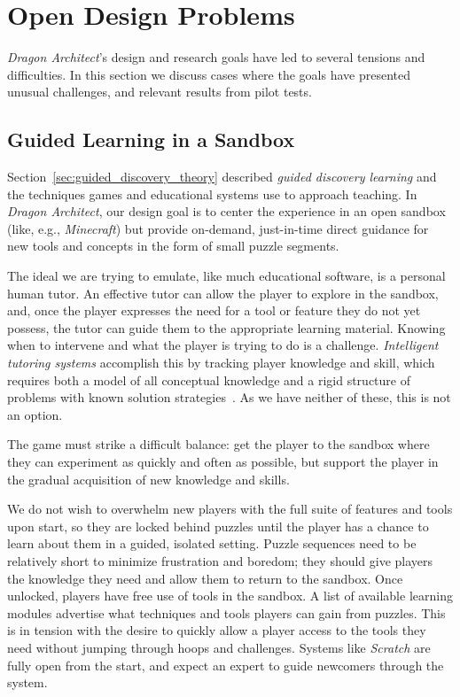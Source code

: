 \documentclass{sig-alternate}
\newcommand{\gametitle}{{\emph{Dragon Architect}}}
\begin{document}
\section{Open Design Problems}
\gametitle{}'s design and research goals have led to several tensions and difficulties.
In this section we discuss cases where the goals have presented unusual challenges, and relevant results from pilot tests.

\subsection{Guided Learning in a Sandbox}
\label{sec:direct_guidance}

Section~\ref{sec:guided_discovery_theory} described \emph{guided discovery learning} and the techniques games and educational systems use to approach teaching.
In \gametitle{}, our design goal is to center the experience in an open sandbox (like, e.g., \emph{Minecraft}) but provide on-demand, just-in-time direct guidance for new tools and concepts in the form of small puzzle segments.

The ideal we are trying to emulate, like much educational software, is a personal human tutor.
An effective tutor can allow the player to explore in the sandbox, and, once the player expresses the need for a tool or feature they do not yet possess, the tutor can guide them to the appropriate learning material.
Knowing when to intervene and what the player is trying to do is a challenge.
\emph{Intelligent tutoring systems} accomplish this by tracking player knowledge and skill, which requires both a model of all conceptual knowledge and a rigid structure of problems with known solution strategies~\cite{koedinger06cognitive}.
As we have neither of these, this is not an option.

The game must strike a difficult balance: get the player to the sandbox where they can experiment as quickly and often as possible, but support the player in the gradual acquisition of new knowledge and skills. 

We do not wish to overwhelm new players with the full suite of features and tools upon start, so they are locked behind puzzles until the player has a chance to learn about them in a guided, isolated setting.
Puzzle sequences need to be relatively short to minimize frustration and boredom; they should give players the knowledge they need and allow them to return to the sandbox.
Once unlocked, players have free use of tools in the sandbox.
A list of available learning modules advertise what techniques and tools players can gain from puzzles.
This is in tension with the desire to quickly allow a player access to the tools they need without jumping through hoops and challenges. 
Systems like \emph{Scratch} are fully open from the start, and expect an expert to guide newcomers through the system.
\end{document}
